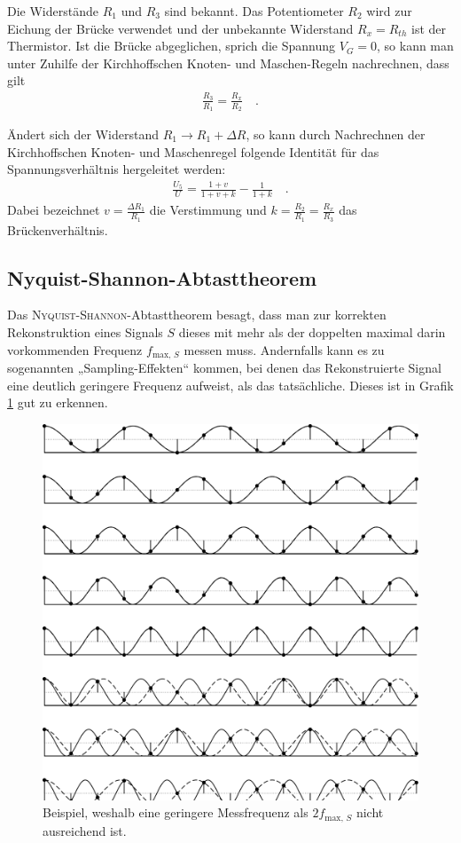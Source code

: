 \documentclass[12pt,a4paper,titlepage,headinclude]{scrartcl}
\numberwithin{equation}{subsection}
\begin{document}
Die Widerstände $R_1$ und $R_3$ sind bekannt.
Das Potentiometer $R_2$ wird zur Eichung der Brücke verwendet und der unbekannte Widerstand $R_x=R_{th}$ ist der Thermistor.
Ist die Brücke abgeglichen, sprich die Spannung $V_G=0$, so kann man unter Zuhilfe der Kirchhoffschen Knoten- und Maschen-Regeln nachrechnen, dass gilt
\begin{align*}
	\frac{R_3}{R_1}=\frac{R_x}{R_2}\quad.
\end{align*}

Ändert sich der Widerstand $R_1\rightarrow R_1+\Delta R$, so kann durch Nachrechnen der Kirchhoffschen Knoten- und Maschenregel folgende Identität für das Spannungsverhältnis hergeleitet werden:
\begin{align}
	\frac{U_5}{U}=\frac{1+v}{1+v+k}-\frac{1}{1+k}\quad.
	\label{eq:spannungsveraeltnis}
\end{align}
Dabei bezeichnet $v=\frac{\Delta R_1}{R_1}$ die Verstimmung und $k=\frac{R_2}{R_1}=\frac{R_x}{R_3}$ das Brückenverhältnis.

\subsection{Nyquist-Shannon-Abtasttheorem}
Das \textsc{Nyquist-Shannon}-Abtasttheorem besagt, dass man zur korrekten Rekonstruktion eines Signals $S$ dieses mit mehr als der doppelten maximal darin vorkommenden Frequenz $f_{\text{max, }S}$ messen muss.
Andernfalls kann es zu sogenannten „Sampling-Effekten“ kommen, bei denen das Rekonstruierte Signal eine deutlich geringere Frequenz aufweist, als das tatsächliche.
Dieses ist in Grafik \ref{fig:nyquist} gut zu erkennen.
\begin{figure}[h]
  \centering
  \includegraphics[width=0.4\linewidth]{nyquist}
  \caption{Beispiel, weshalb eine geringere Messfrequenz als $2f_{\text{max, }S}$ nicht ausreichend ist.\protect\footnotemark\label{fig:nyquist}}
\end{figure}
\end{document}

